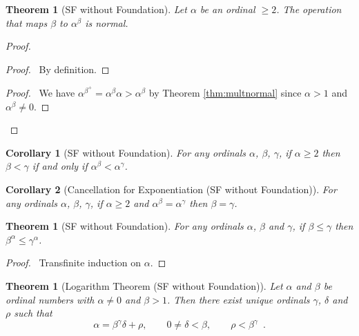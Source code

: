 \documentclass{book}
\let\qed\relax
\newtheorem{cor}{Corollary}[ax]
\newtheorem{thm}[ax]{Theorem}
\theoremstyle{definition}
\begin{document}
\begin{thm}[SF without Foundation]
Let $\alpha$ be an ordinal $\geq 2$. The operation that maps $\beta$ to $\alpha^\beta$ is normal.
\end{thm}

\begin{proof}
\pf
{}
\begin{proof}
	\pf\ By definition.
\end{proof}
\begin{proof}
	\pf\ We have $\alpha^{\beta^+} = \alpha^\beta \alpha > \alpha^\beta$ by Theorem \ref{thm:multnormal} since $\alpha > 1$ and $\alpha^\beta \neq 0$.
\end{proof}
\qed
\end{proof}

\begin{cor}[SF without Foundation]
For any ordinals $\alpha$, $\beta$, $\gamma$, if $\alpha \geq 2$ then $\beta < \gamma$ if and only if $\alpha^\beta < \alpha^\gamma$.
\end{cor}

\begin{cor}[Cancellation for Exponentiation (SF without Foundation)]
For any ordinals $\alpha$, $\beta$, $\gamma$, if $\alpha \geq 2$ and $\alpha^\beta = \alpha^\gamma$ then $\beta = \gamma$.
\end{cor}

\begin{thm}[SF without Foundation]
For any ordinals $\alpha$, $\beta$ and $\gamma$, if $\beta \leq \gamma$ then $\beta^\alpha \leq \gamma^\alpha$.
\end{thm}

\begin{proof}
\pf\ Transfinite induction on $\alpha$.
\end{proof}

\begin{thm}[Logarithm Theorem (SF without Foundation)]
Let $\alpha$ and $\beta$ be ordinal numbers with $\alpha \neq 0$ and $\beta > 1$. Then there exist unique ordinals $\gamma$, $\delta$ and $\rho$ such that
\[ \alpha = \beta^\gamma \delta + \rho, \qquad 0 \neq \delta < \beta, \qquad \rho < \beta^\gamma \enspace . \]
\end{thm}
\end{document}
